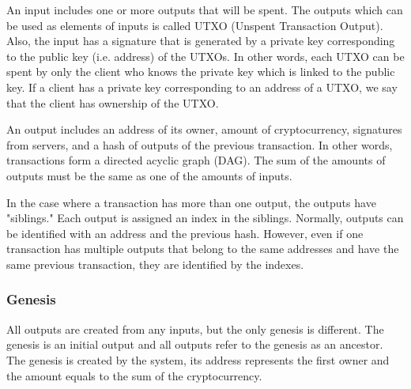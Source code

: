 \documentclass[a4paper, oneside]{discothesis}
\begin{document}
An input includes one or more outputs that will be spent.
The outputs which can be used as elements of inputs is called UTXO (Unspent Transaction Output).
Also, the input has a signature that is generated by a private key
corresponding to the public key (i.e. address) of the UTXOs.
In other words, each UTXO can be spent by only the client who knows the private
key which is linked to the public key.
If a client has a private key corresponding to an address of a UTXO,
we say that the client has ownership of the UTXO.

An output includes an address of its owner, amount of cryptocurrency, signatures from servers,
and a hash of outputs of the previous transaction.
In other words, transactions form a directed acyclic graph (DAG).
The sum of the amounts of outputs must be the same as one of the amounts of inputs.

In the case where a transaction has more than one output, the outputs have "siblings."
Each output is assigned an index in the siblings.
Normally, outputs can be identified with an address and the previous hash.
However, even if one transaction has multiple outputs that belong to the same addresses
and have the same previous transaction, they are identified by the indexes.


\subsubsection{Genesis}
All outputs are created from any inputs, but the only genesis is different.
The genesis is an initial output and all outputs refer to the genesis as an ancestor.
The genesis is created by the system, its address represents the first owner
and the amount equals to the sum of the cryptocurrency.
\end{document}
